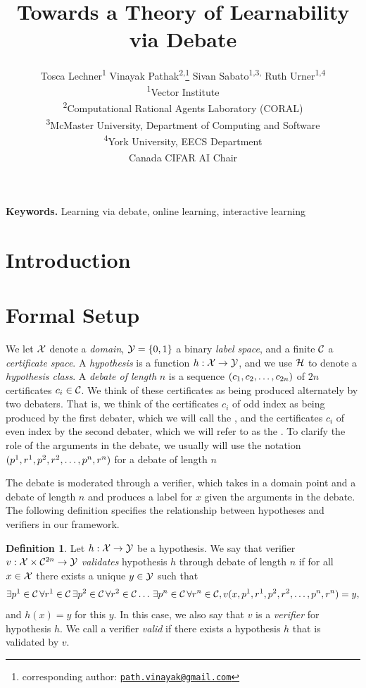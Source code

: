 \documentclass[11pt,letterpaper]{article}
\title{Towards a Theory of Learnability via Debate}
\author{
  Tosca Lechner\textsuperscript{1}\quad
  Vinayak Pathak\textsuperscript{2,}\thanks{corresponding author: \href{mailto:path.vinayak@gmail.com}{\nolinkurl{path.vinayak@gmail.com}}}\quad
  Sivan Sabato\textsuperscript{1,3,\textdagger}\quad
  Ruth Urner\textsuperscript{1,4}\\[0.6em]
  {\small\textsuperscript{1}Vector Institute}\\
  {\small\textsuperscript{2}Computational Rational Agents Laboratory (CORAL)}\\
  {\small\textsuperscript{3}McMaster University, Department of Computing and Software}\\
  {\small\textsuperscript{4}York University, EECS Department}\\[0.2em]
  {\footnotesize\textsuperscript{\textdagger}Canada CIFAR AI Chair}
}
\date{}
\theoremstyle{definition}
\newtheorem{definition}[theorem]{Definition}
\theoremstyle{plain}
\begin{document}
\maketitle

\begin{abstract}%
\end{abstract}

\noindent\textbf{Keywords.} Learning via debate, online learning, interactive learning

\section{Introduction}




\section{Formal Setup}\label{sec:formal}
We let ${\mathcal X}$ denote a \emph{domain}, ${\mathcal Y} = \{0,1\}$ a binary \emph{label space}, and a finite ${{\mathcal C}}$ a \emph{certificate space}.  
A \emph{hypothesis} is a function $h:{\mathcal X}\to{\mathcal Y}$, and we use ${{\mathcal H}}$ to denote a \emph{hypothesis class}.
A \emph{debate of length} $n$ is a sequence $(c_1, c_2, \ldots, c_{2n})$ of $2n$ certificates $c_i\in{{\mathcal C}}$. We think of these certificates as being produced alternately by two debaters. That is, we think of the certificates $c_i$ of odd index as being produced by the first debater, which we will call the \dt, and the certificates $c_i$ of even index by the second debater, which we will refer to as the \df. To clarify the role of the arguments in the debate, we usually will use the notation $({p}^1, {r}^1, {p}^2, {r}^2, \ldots,  {p}^n, {r}^n)$ for a debate of length $n$

The debate is moderated through a verifier, which takes in a domain point and a debate of length $n$ and produces a label for $x$ given the arguments in the debate. 
The following definition specifies the relationship between hypotheses and verifiers in our framework.

\begin{definition}\label{def:verifier_validates_hypothesis}
Let $h:{\mathcal X}\to{\mathcal Y}$ be a hypothesis. We say that verifier $v: {\mathcal X}\times {{\mathcal C}}^{2n} \to {\mathcal Y}$ \emph{validates} hypothesis $h$ through debate of length $n$ if for all $x\in{\mathcal X}$ there exists a unique $y\in {\mathcal Y}$ such that
\begin{align*}
\exists{p}^1\in{{\mathcal C}}\,\forall{r}^1\in{{\mathcal C}}\,\exists{p}^2\in{{\mathcal C}}\,\forall {r}^2\in{{\mathcal C}}\ldots\,\exists{p}^n\in{{\mathcal C}}\,\forall{r}^n\in{{\mathcal C}},
v(x, {p}^1, {r}^1, {p}^2, {r}^2, \ldots,  {p}^n, {r}^n) = y,
\end{align*}
and $h(x) = y$ for this $y$. 
In this case, we also say that $v$ is a \emph{verifier} for hypothesis $h$. We call a verifier \emph{valid} if there exists a hypothesis $h$ that is validated by $v$.
\end{definition}
\end{document}
